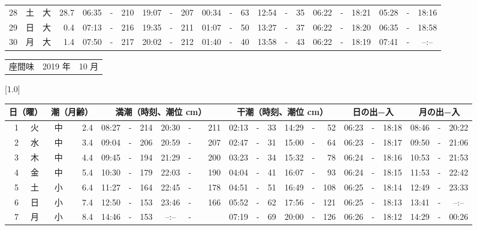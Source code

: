 \documentclass[12pt,a4j]{jsarticle}
\begin{document}
\begin{table}[htbp]
\begin{center}
{\begin{tabular}{|rc|cr|ccrccr|ccrccr|ccc|ccc|}
28 & 土 & 大 & 28.7 &  06:35 &-& 210 &  19:07 &-& 207 &  00:34 &-&  63 &  12:54 &-&  35 & 06:22 & -& 18:21 & 05:28 & -& 18:16 \\
29 & 日 & 大 &  0.4 &  07:13 &-& 216 &  19:35 &-& 211 &  01:07 &-&  50 &  13:27 &-&  37 & 06:22 & -& 18:20 & 06:35 & -& 18:58 \\
30 & 月 & 大 &  1.4 &  07:50 &-& 217 &  20:02 &-& 212 &  01:40 &-&  40 &  13:58 &-&  43 & 06:22 & -& 18:19 & 07:41 & -& --:-- \\
   \hline
   \end{tabular}}
   \end{center}
\end{table}
\newpage
 \begin{table}[htbp]
 \begin{center}
 \begin{tabular}{lcc}
 \LARGE{座間味}  & \large{2019 年} & \large{10 月} \\
 \end{tabular}
 \end{center}
 \begin{center}
    \scalebox{0.7}[1.0]{
    \begin{tabular}{|rc|cr|ccrccr|ccrccr|ccc|ccc|}
    \hline
    \multicolumn{2}{|c|}{日（曜）} & \multicolumn{2}{c|}{潮（月齢）} & \multicolumn{6}{c|}{満潮（時刻、潮位 cm）} & \multicolumn{6}{c|}{干潮（時刻、潮位 cm）} & \multicolumn{3}{c|}{日の出−入} &  \multicolumn{3}{c|}{月の出−入}\\
 \hline
 1 & 火 & 中 &  2.4 &  08:27 &-& 214 &  20:30 &-& 211 &  02:13 &-&  33 &  14:29 &-&  52 & 06:23 & -& 18:18 & 08:46 & -& 20:22 \\
 2 & 水 & 中 &  3.4 &  09:04 &-& 206 &  20:59 &-& 207 &  02:47 &-&  31 &  15:00 &-&  64 & 06:23 & -& 18:17 & 09:50 & -& 21:06 \\
 3 & 木 & 中 &  4.4 &  09:45 &-& 194 &  21:29 &-& 200 &  03:23 &-&  34 &  15:32 &-&  78 & 06:24 & -& 18:16 & 10:53 & -& 21:53 \\
 4 & 金 & 中 &  5.4 &  10:30 &-& 179 &  22:03 &-& 190 &  04:04 &-&  41 &  16:07 &-&  93 & 06:24 & -& 18:15 & 11:53 & -& 22:42 \\
 5 & 土 & 小 &  6.4 &  11:27 &-& 164 &  22:45 &-& 178 &  04:51 &-&  51 &  16:49 &-& 108 & 06:25 & -& 18:14 & 12:49 & -& 23:33 \\
 6 & 日 & 小 &  7.4 &  12:50 &-& 153 &  23:46 &-& 166 &  05:52 &-&  62 &  17:56 &-& 121 & 06:25 & -& 18:13 & 13:41 & -& --:-- \\
 7 & 月 & 小 &  8.4 &  14:46 &-& 153 &  --:-- &-&~~~~~ &  07:19 &-&  69 &  20:00 &-& 126 & 06:26 & -& 18:12 & 14:29 & -& 00:26 \\

\end{tabular}}
\end{center}
\end{table}
\end{document}
